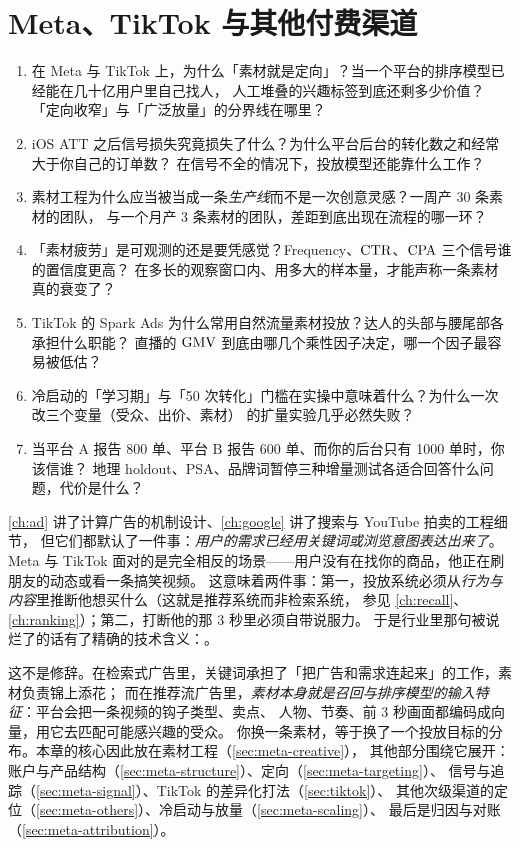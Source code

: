 \chapter{Meta、TikTok 与其他付费渠道}
\label{ch:meta}

\begin{insight}[本章要解决的问题]
\begin{enumerate}
  \item 在 Meta 与 TikTok 上，为什么「素材就是定向」？当一个平台的排序模型已经能在几十亿用户里自己找人，
        人工堆叠的兴趣标签到底还剩多少价值？「定向收窄」与「广泛放量」的分界线在哪里？
  \item iOS ATT 之后信号损失究竟损失了什么？为什么平台后台的转化数之和经常大于你自己的订单数？
        在信号不全的情况下，投放模型还能靠什么工作？
  \item 素材工程为什么应当被当成一条\emph{生产线}而不是一次创意灵感？一周产 30 条素材的团队，
        与一个月产 3 条素材的团队，差距到底出现在流程的哪一环？
  \item 「素材疲劳」是可观测的还是要凭感觉？Frequency、$\operatorname{CTR}$、$\operatorname{CPA}$ 三个信号谁的置信度更高？
        在多长的观察窗口内、用多大的样本量，才能声称一条素材真的衰变了？
  \item TikTok 的 Spark Ads 为什么常用自然流量素材投放？达人的头部与腰尾部各承担什么职能？
        直播的 $\operatorname{GMV}$ 到底由哪几个乘性因子决定，哪一个因子最容易被低估？
  \item 冷启动的「学习期」与「50 次转化」门槛在实操中意味着什么？为什么一次改三个变量（受众、出价、素材）
        的扩量实验几乎必然失败？
  \item 当平台 A 报告 800 单、平台 B 报告 600 单、而你的后台只有 1000 单时，你该信谁？
        地理 holdout、PSA、品牌词暂停三种增量测试各适合回答什么问题，代价是什么？
\end{enumerate}
\end{insight}

\cref{ch:ad} 讲了计算广告的机制设计、\cref{ch:google} 讲了搜索与 YouTube 拍卖的工程细节，
但它们都默认了一件事：\emph{用户的需求已经用关键词或浏览意图表达出来了}。
Meta 与 TikTok 面对的是完全相反的场景——用户没有在找你的商品，他正在刷朋友的动态或看一条搞笑视频。
这意味着两件事：第一，投放系统必须从\emph{行为与内容}里推断他想买什么（这就是推荐系统而非检索系统，
参见 \cref{ch:recall}、\cref{ch:ranking}）；第二，打断他的那 3 秒里必须自带说服力。
于是行业里那句被说烂了的话有了精确的技术含义：。

这不是修辞。在检索式广告里，关键词承担了「把广告和需求连起来」的工作，素材负责锦上添花；
而在推荐流广告里，\emph{素材本身就是召回与排序模型的输入特征}：平台会把一条视频的钩子类型、卖点、
人物、节奏、前 3 秒画面都编码成向量，用它去匹配可能感兴趣的受众。
你换一条素材，等于换了一个投放目标的分布。本章的核心因此放在素材工程（\cref{sec:meta-creative}），
其他部分围绕它展开：账户与产品结构（\cref{sec:meta-structure}）、定向（\cref{sec:meta-targeting}）、
信号与追踪（\cref{sec:meta-signal}）、TikTok 的差异化打法（\cref{sec:tiktok}）、
其他次级渠道的定位（\cref{sec:meta-others}）、冷启动与放量（\cref{sec:meta-scaling}）、
最后是归因与对账（\cref{sec:meta-attribution}）。

